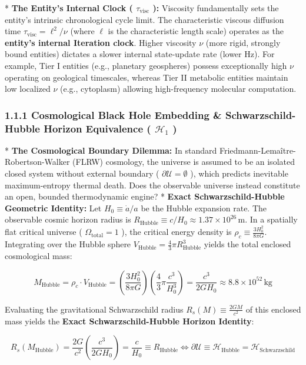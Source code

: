 \documentclass[11pt,a4paper]{article}
\theoremstyle{definition}
\theoremstyle{remark}
\begin{document}
* \textbf{The Entity's Internal Clock ( $\tau_{\text{visc}}$ ):}
Viscosity fundamentally sets the entity's intrinsic chronological cycle limit. The characteristic viscous diffusion time $\tau_{\text{visc}} = \ell^2/\nu$ (where $\ell$ is the characteristic length scale) operates as the \textbf{entity's internal Iteration clock}. Higher viscosity $\nu$ (more rigid, strongly bound entities) dictates a slower internal state-update rate (lower Hz). For example, Tier I entities (e.g., planetary geospheres) possess exceptionally high $\nu$ operating on geological timescales, whereas Tier II metabolic entities maintain low localized $\nu$ (e.g., cytoplasm) allowing high-frequency molecular computation.

\subsubsection{1.1.1 Cosmological Black Hole Embedding \& Schwarzschild-Hubble Horizon Equivalence ( $\mathcal{H}_1$ )}
* \textbf{The Cosmological Boundary Dilemma:} In standard Friedmann-Lemaître-Robertson-Walker (FLRW) cosmology, the universe is assumed to be an isolated closed system without external boundary ( $\partial \mathcal{U} = \emptyset$ ), which predicts inevitable maximum-entropy thermal death. Does the observable universe instead constitute an open, bounded thermodynamic engine?
* \textbf{Exact Schwarzschild-Hubble Geometric Identity:}
Let $H_0 \equiv \dot{a}/a$ be the Hubble expansion rate. The observable cosmic horizon radius is $R_{\text{Hubble}} \equiv c/H_0 \approx 1.37 \times 10^{26} \, \mathrm{m}$. In a spatially flat critical universe ( $\Omega_{\text{total}} = 1$ ), the critical energy density is $\rho_c \equiv \frac{3 H_0^2}{8\pi G}$. Integrating over the Hubble sphere $V_{\text{Hubble}} = \frac{4}{3}\pi R_{\text{Hubble}}^3$ yields the total enclosed cosmological mass:


\begin{equation}
M_{\text{Hubble}} = \rho_c \cdot V_{\text{Hubble}} = \left( \frac{3 H_0^2}{8\pi G} \right) \left( \frac{4}{3}\pi \frac{c^3}{H_0^3} \right) = \frac{c^3}{2 G H_0} \approx 8.8 \times 10^{52} \, \mathrm{kg}
\end{equation}


Evaluating the gravitational Schwarzschild radius $R_s(M) \equiv \frac{2 G M}{c^2}$ of this enclosed mass yields the \textbf{Exact Schwarzschild-Hubble Horizon Identity}:


\begin{equation}
\boxed{R_s(M_{\text{Hubble}}) = \frac{2 G}{c^2} \left( \frac{c^3}{2 G H_0} \right) = \frac{c}{H_0} \equiv R_{\text{Hubble}} \iff \partial \mathcal{U} \equiv \mathcal{H}_{\text{Hubble}} = \mathcal{H}_{\text{Schwarzschild}}}
\end{equation}
\end{document}
